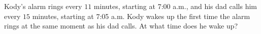 Kody's alarm rings every $11$ minutes, starting at 7:00 a.m., and his dad calls him every $15$ minutes, starting at 7:05 a.m. Kody wakes up the first time the alarm rings at the same moment as his dad calls. At what time does he wake up?
